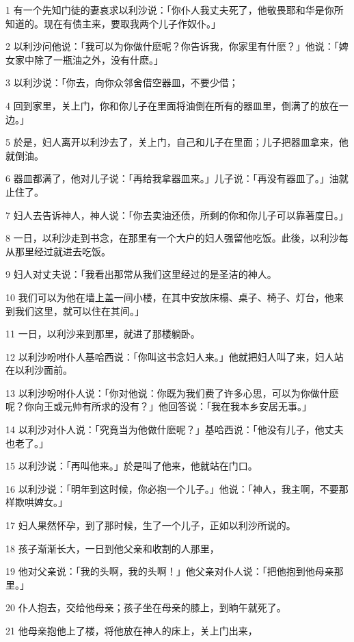 \par 1 有一个先知门徒的妻哀求以利沙说：「你仆人我丈夫死了，他敬畏耶和华是你所知道的。现在有债主来，要取我两个儿子作奴仆。」
\par 2 以利沙问他说：「我可以为你做什麽呢？你告诉我，你家里有什麽？」他说：「婢女家中除了一瓶油之外，没有什麽。」
\par 3 以利沙说：「你去，向你众邻舍借空器皿，不要少借；
\par 4 回到家里，关上门，你和你儿子在里面将油倒在所有的器皿里，倒满了的放在一边。」
\par 5 於是，妇人离开以利沙去了，关上门，自己和儿子在里面；儿子把器皿拿来，他就倒油。
\par 6 器皿都满了，他对儿子说：「再给我拿器皿来。」儿子说：「再没有器皿了。」油就止住了。
\par 7 妇人去告诉神人，神人说：「你去卖油还债，所剩的你和你儿子可以靠著度日。」
\par 8 一日，以利沙走到书念，在那里有一个大户的妇人强留他吃饭。此後，以利沙每从那里经过就进去吃饭。
\par 9 妇人对丈夫说：「我看出那常从我们这里经过的是圣洁的神人。
\par 10 我们可以为他在墙上盖一间小楼，在其中安放床榻、桌子、椅子、灯台，他来到我们这里，就可以住在其间。」
\par 11 一日，以利沙来到那里，就进了那楼躺卧。
\par 12 以利沙吩咐仆人基哈西说：「你叫这书念妇人来。」他就把妇人叫了来，妇人站在以利沙面前。
\par 13 以利沙吩咐仆人说：「你对他说：你既为我们费了许多心思，可以为你做什麽呢？你向王或元帅有所求的没有？」他回答说：「我在我本乡安居无事。」
\par 14 以利沙对仆人说：「究竟当为他做什麽呢？」基哈西说：「他没有儿子，他丈夫也老了。」
\par 15 以利沙说：「再叫他来。」於是叫了他来，他就站在门口。
\par 16 以利沙说：「明年到这时候，你必抱一个儿子。」他说：「神人，我主啊，不要那样欺哄婢女。」
\par 17 妇人果然怀孕，到了那时候，生了一个儿子，正如以利沙所说的。
\par 18 孩子渐渐长大，一日到他父亲和收割的人那里，
\par 19 他对父亲说：「我的头啊，我的头啊！」他父亲对仆人说：「把他抱到他母亲那里。」
\par 20 仆人抱去，交给他母亲；孩子坐在母亲的膝上，到晌午就死了。
\par 21 他母亲抱他上了楼，将他放在神人的床上，关上门出来，
